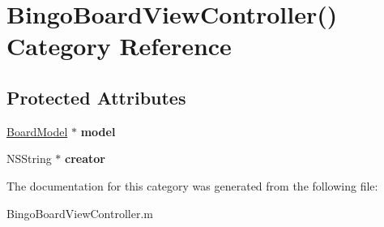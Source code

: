 \hypertarget{category_bingo_board_view_controller_07_08}{\section{Bingo\+Board\+View\+Controller() Category Reference}
\label{category_bingo_board_view_controller_07_08}
}
\subsection*{Protected Attributes}
\begin{DoxyCompactItemize}
\item 
\hypertarget{category_bingo_board_view_controller_07_08_ad4bcc5fe655f47b74e9014a00481819e}{\hyperlink{interface_board_model}{Board\+Model} $\ast$ {\bfseries model}}\label{category_bingo_board_view_controller_07_08_ad4bcc5fe655f47b74e9014a00481819e}

\item 
\hypertarget{category_bingo_board_view_controller_07_08_a2c91e36c21b9b0b9f6ff3b3df8fa8899}{N\+S\+String $\ast$ {\bfseries creator}}\label{category_bingo_board_view_controller_07_08_a2c91e36c21b9b0b9f6ff3b3df8fa8899}

\end{DoxyCompactItemize}


The documentation for this category was generated from the following file\+:\begin{DoxyCompactItemize}
\item 
Bingo\+Board\+View\+Controller.\+m\end{DoxyCompactItemize}
